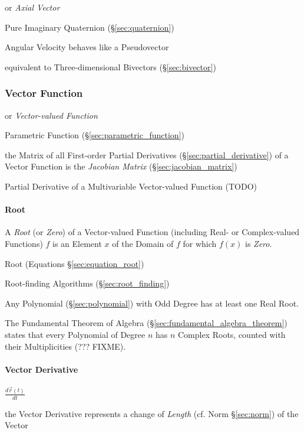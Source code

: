 or \emph{Axial Vector}

\fist Pure Imaginary Quaternion (\S\ref{sec:quaternion})

Angular Velocity behaves like a Pseudovector

equivalent to Three-dimensional Bivectors (\S\ref{sec:bivector})



\subsubsection{Vector Function}\label{sec:vector_function}

or \emph{Vector-valued Function}

\fist Parametric Function (\S\ref{sec:parametric_function})

the Matrix of all First-order Partial Derivatives
(\S\ref{sec:partial_derivative}) of a Vector Function is the \emph{Jacobian
  Matrix} (\S\ref{sec:jacobian_matrix})

Partial Derivative of a Multivariable Vector-valued Function (TODO)



\paragraph{Root}\label{sec:function_root}\hfill

A \emph{Root} (or \emph{Zero}) of a Vector-valued Function (including Real- or
Complex-valued Functions) $f$ is an Element $x$ of the Domain of $f$ for which
$f(x)$ is \emph{Zero}.

\fist Root (Equations \S\ref{sec:equation_root})

\fist Root-finding Algorithms (\S\ref{sec:root_finding})

Any Polynomial (\S\ref{sec:polynomial}) with Odd Degree has at least
one Real Root.

The Fundamental Theorem of Algebra (\S\ref{sec:fundamental_algebra_theorem})
states that every Polynomial of Degree $n$ has $n$ Complex Roots, counted with
their Multiplicities (??? FIXME).



\paragraph{Vector Derivative}\label{sec:vector_derivative}\hfill

$\frac{d\vec{r}(t)}{dt}$

the Vector Derivative represents a change of \emph{Length} (cf. Norm
\S\ref{sec:norm}) of the Vector



